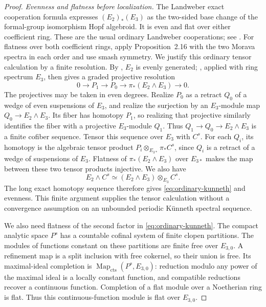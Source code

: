\begin{proof}
\emph{Evenness and flatness before localization.}
The Landweber exact cooperation formula expresses $(E_2)_*(E_3)$
as the two-sided base change of the formal-group isomorphism Hopf
algebroid.  It is even and flat over either coefficient ring.  These
are the usual ordinary Landweber cooperations; see
\cite[Theorem~2.7 and Propositions~2.12 and~2.16]{HS99}.
For flatness over both coefficient rings, apply Proposition~2.16
with the two Morava spectra in each order and use smash symmetry.
We justify this ordinary tensor calculation by a finite resolution.
By \cite[Proposition~2.12]{HS99}, $E_2$ is evenly generated;
\cite[Proposition~2.16]{HS99}, applied with ring spectrum $E_3$,
then gives a graded projective resolution
\[
  0\longrightarrow P_1\longrightarrow P_0
       \longrightarrow\pi_*(E_2\wedge E_3)\longrightarrow0.
\]
The projectives may be taken in even degrees. Realize $P_0$ as a
retract $Q_0$ of a wedge of even suspensions of $E_3$, and realize
the surjection by an $E_3$-module map $Q_0\to E_2\wedge E_3$.
Its fiber has homotopy $P_1$, so realizing that projective similarly
identifies the fiber with a projective $E_3$-module $Q_1$. Thus
$Q_1\to Q_0\to E_2\wedge E_3$ is a finite cofiber sequence.
Tensor this sequence over $E_3$ with $C^s$. For each $Q_i$, its
homotopy is the algebraic tensor product
$P_i\otimes_{E_{3*}}\pi_*C^s$, since $Q_i$ is a retract of a wedge
of suspensions of $E_3$. Flatness of $\pi_*(E_2\wedge E_3)$ over
$E_{3*}$ makes the map between these two tensor products injective.
We also have
\[
  E_2\wedge C^s\simeq(E_2\wedge E_3)\otimes_{E_3}C^s.
\]
The long exact homotopy sequence therefore gives
\eqref{eq:ordinary-kunneth} and evenness. This finite
argument supplies the tensor calculation without a convergence
assumption on an unbounded periodic K\"unneth spectral sequence.

We also need flatness of the second factor in
\eqref{eq:ordinary-kunneth}.  The compact analytic space $P^s$ has a
countable cofinal system of finite clopen partitions.  The modules of
functions constant on these partitions are finite free over $E_{3,0}$.
A refinement map is a split inclusion with free cokernel, so their
union is free.  Its maximal-ideal completion is
$\operatorname{Map}_{\mathrm{cts}}(P^s,E_{3,0})$: reduction modulo any
power of the maximal ideal is a locally constant function, and
compatible reductions recover a continuous function.  Completion of
a flat module over a Noetherian ring is flat.  Thus this
continuous-function module is flat over $E_{3,0}$.


\end{proof}
